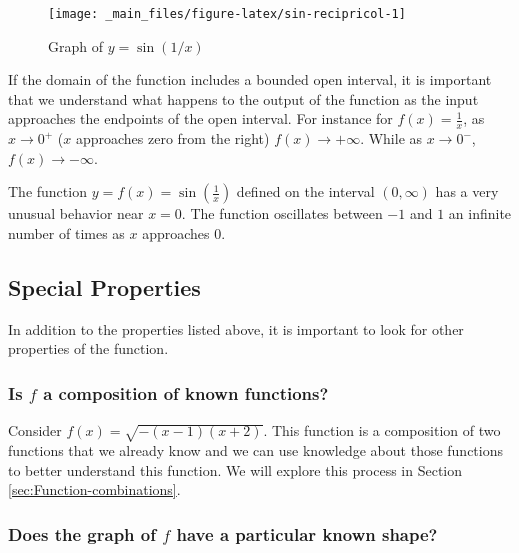 \documentclass[
]{book}
\theoremstyle{definition}
\theoremstyle{definition}
\theoremstyle{definition}
\theoremstyle{remark}
\begin{document}
\begin{figure}

{\centering \texttt{[image: \_main\_files/figure-latex/sin-recipricol-1]} 

}

\caption{Graph of $y=\sin(1/x)$}\label{fig:sin-recipricol}
\end{figure}

If the domain of the function includes a bounded open interval, it is important that we understand what happens to the output of the function as the input approaches the endpoints of the open interval. For instance for \(f(x)=\frac{1}{x}\), as \(x\rightarrow 0^+\) (\(x\) approaches zero from the right) \(f(x)\rightarrow +\infty\). While as \(x\rightarrow 0^-\), \(f(x)\rightarrow -\infty\).

The function \(y=f(x)=\sin\left(\frac{1}{x}\right)\) defined on the interval \((0,\infty)\) has a very unusual behavior near \(x=0\). The function oscillates between \(-1\) and \(1\) an infinite number of times as \(x\) approaches \(0\).

\hypertarget{special-properties}{%
\subsection{Special Properties}\label{special-properties}}

In addition to the properties listed above, it is important to look for other properties of the function.

\hypertarget{is-f-a-composition-of-known-functions}{%
\subsubsection*{\texorpdfstring{Is \(f\) a composition of known functions?}{Is f a composition of known functions?}}\label{is-f-a-composition-of-known-functions}}

Consider \(f(x)=\sqrt{-(x-1)(x+2)}\). This function is a composition of two functions that we already know and we can use knowledge about those functions to better understand this function. We will explore this process in Section \ref{sec:Function-combinations}.

\hypertarget{does-the-graph-of-f-have-a-particular-known-shape}{%
\subsubsection*{\texorpdfstring{Does the graph of \(f\) have a particular known shape?}{Does the graph of f have a particular known shape?}}\label{does-the-graph-of-f-have-a-particular-known-shape}}
\end{document}
